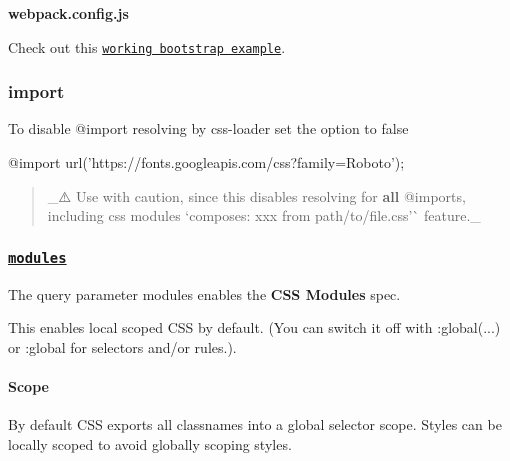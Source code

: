 {\bfseries webpack.\+config.\+js} 


Check out this \href{https://github.com/bbtfr/webpack2-bootstrap-sass-sample}{\tt working bootstrap example}.

\subsubsection*{{\ttfamily import}}

To disable {\ttfamily @import} resolving by {\ttfamily css-\/loader} set the option to {\ttfamily false}


\begin{DoxyCode}
@import url('https://fonts.googleapis.com/css?family=Roboto');
\end{DoxyCode}


\begin{quote}
\+\_\+⚠️ Use with caution, since this disables resolving for {\bfseries all} {\ttfamily @import}s, including css modules `composes\+: xxx from \textquotesingle{}path/to/file.\+css'\`{} feature.\+\_\+ \end{quote}


\subsubsection*{\href{https://github.com/css-modules/css-modules}{\tt {\ttfamily modules}}}

The query parameter {\ttfamily modules} enables the {\bfseries C\+SS Modules} spec.

This enables local scoped C\+SS by default. (You can switch it off with {\ttfamily \+:global(...)} or {\ttfamily \+:global} for selectors and/or rules.).

\paragraph*{{\ttfamily Scope}}

By default C\+SS exports all classnames into a global selector scope. Styles can be locally scoped to avoid globally scoping styles.

